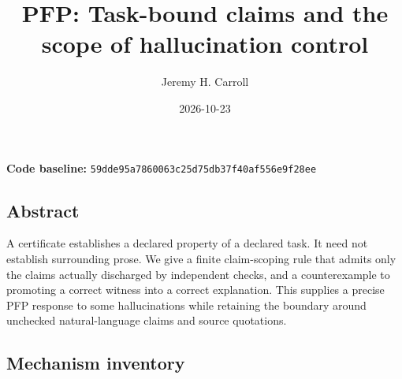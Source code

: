 \documentclass[
  11pt,
]{article}
\title{PFP: Task-bound claims and the scope of hallucination control}
\author{Jeremy H. Carroll}
\date{2026-10-23}
\begin{document}
\makeatletter
\begin{center}
{\LARGE \@title\par}
\vspace{0.8em}
{\normalsize \@author\par}
\vspace{0.5em}
{\small \@date\par}
\end{center}
\makeatother

\textbf{Code baseline:}
\nolinkurl{59dde95a7860063c25d75db37f40af556e9f28ee}

\subsection{Abstract}\label{abstract}

A certificate establishes a declared property of a declared task. It
need not establish surrounding prose. We give a finite claim-scoping
rule that admits only the claims actually discharged by independent
checks, and a counterexample to promoting a correct witness into a
correct explanation. This supplies a precise PFP response to some
hallucinations while retaining the boundary around unchecked
natural-language claims and source quotations.

\subsection{Mechanism inventory}\label{mechanism-inventory}
\end{document}
